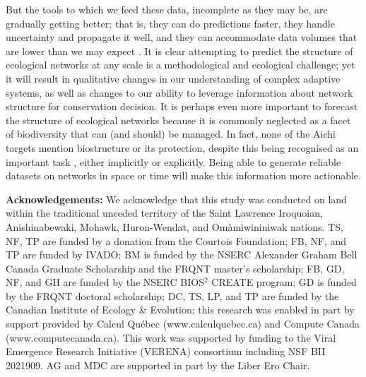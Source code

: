 But the tools to which we feed these data, incomplete as they may be,
are gradually getting better; that is, they can do predictions faster,
they handle uncertainty and propagate it well, and they can accommodate
data volumes that are lower than we may expect \cite{Pichler2020MacLea}.
It is clear attempting to predict the structure of ecological networks
at any scale is a methodological and ecological challenge; yet it will
result in qualitative changes in our understanding of complex adaptive
systems, as well as changes to our ability to leverage information about
network structure for conservation decision. It is perhaps even more
important to forecast the structure of ecological networks because it is
commonly neglected as a facet of biodiversity that can (and should) be
managed. In fact, none of the Aichi targets mention biostructure or its
protection, despite this being recognised as an important task
\cite{McCann2007ProBio}, either implicitly or explicitly. Being able to
generate reliable datasets on networks in space or time will make this
information more actionable.

\textbf{Acknowledgements:} We acknowledge that this study was conducted
on land within the traditional unceded territory of the Saint Lawrence
Iroquoian, Anishinabewaki, Mohawk, Huron-Wendat, and Omàmiwininiwak
nations. TS, NF, TP are funded by a donation from the Courtois
Foundation; FB, NF, and TP are funded by IVADO; BM is funded by the
NSERC Alexander Graham Bell Canada Graduate Scholarship and the FRQNT
master's scholarship; FB, GD, NF, and GH are funded by the NSERC
BIOS\(^2\) CREATE program; GD is funded by the FRQNT doctoral
scholarship; DC, TS, LP, and TP are funded by the Canadian Institute of
Ecology \& Evolution; this research was enabled in part by support
provided by Calcul Québec (www.calculquebec.ca) and Compute Canada
(www.computecanada.ca). This work was supported by funding to the Viral
Emergence Research Initiative (VERENA) consortium including NSF BII
2021909. AG and MDC are supported in part by the Liber Ero Chair.


\endinput
